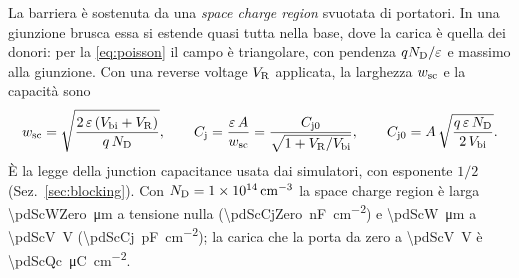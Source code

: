 \documentclass[10pt,a4paper]{scrartcl}
\let\newcommand\pdvaluedefine
\newcommand{\VR}{V_\mathrm{R}}
\newcommand{\Cj}{C_\mathrm{j}}
\newcommand{\Cjo}{C_\mathrm{j0}}
\newcommand{\ND}{N_\mathrm{D}}
\newcommand{\wsc}{w_\mathrm{sc}}
\newcommand{\Vbi}{V_\mathrm{bi}}
\newcommand{\Pp}{p\textsuperscript{+}}
\newcommand{\Nm}{n\textsuperscript{--}}
\begin{document}
La barriera è sostenuta da una \emph{space charge region} svuotata di portatori. In una giunzione \Pp\Nm{} brusca essa si estende quasi tutta nella base, dove la carica è quella dei donori: per la \eqref{eq:poisson} il campo è triangolare, con pendenza $q\ND/\varepsilon$ e massimo alla giunzione. Con una reverse voltage $\VR$ applicata, la larghezza $\wsc$ e la capacità sono
\begin{equation}
\wsc = \sqrt{\frac{2\,\varepsilon\,(\Vbi + \VR)}{q\,\ND}} , \qquad
\Cj = \frac{\varepsilon\,A}{\wsc} = \frac{\Cjo}{\sqrt{1 + \VR/\Vbi}} , \qquad \Cjo = A\,\sqrt{\frac{q\,\varepsilon\,\ND}{2\,\Vbi}} .
\label{eq:wsc}
\end{equation}
È la legge della junction capacitance usata dai simulatori, con esponente $1/2$ (Sez.~\ref{sec:blocking}). Con $\ND = \SI{1e14}{\centi\metre^{-3}}$ la space charge region è larga \SI{\pdScWZero}{\micro\metre} a tensione nulla (\SI{\pdScCjZero}{\nano\farad\per\centi\metre\squared}) e \SI{\pdScW}{\micro\metre} a \SI{\pdScV}{\volt} (\SI{\pdScCj}{\pico\farad\per\centi\metre\squared}); la carica che la porta da zero a \SI{\pdScV}{\volt} è \SI{\pdScQc}{\micro\coulomb\per\centi\metre\squared}.
\end{document}
